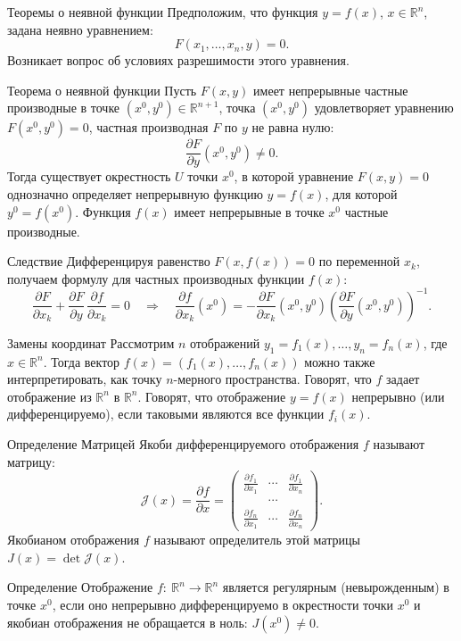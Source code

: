 \documentclass[8pt]{beamer}
\newcommand{\pp}[2]{\frac{\partial #1}{\partial #2}}
\begin{document}
\begin{frame}{Теоремы о неявной функции}
Предположим, что функция $y = f(x)$, $x\in\mathbb{R}^n$, задана неявно уравнением:
$$F(x_1,\ldots, x_n, y) = 0.$$
Возникает вопрос об условиях разрешимости этого уравнения.

\begin{block}{Теорема о неявной функции}
Пусть $F(x,y)$ имеет непрерывные частные производные в точке $(x^0,y^0)\in\mathbb{R}^{n+1}$, точка $(x^0,y^0)$ удовлетворяет уравнению $F(x^0,y^0)=0$, частная производная $F$ по $y$ не равна нулю:
$$\pp{F}{y}(x^0,y^0)\ne 0.$$
Тогда существует окрестность $U$ точки $x^0$, в которой уравнение $F(x,y)=0$ однозначно определяет непрерывную функцию $y = f(x)$, для которой $y^0=f(x^0)$. Функция $f(x)$ имеет непрерывные в точке $x^0$ частные производные.
\end{block}
\begin{block}{Следствие}
Дифференцируя равенство $F(x,f(x))=0$ по переменной $x_k$, получаем формулу для частных производных функции $f(x)$:
$$\pp{F}{x_k}+ \pp{F}{y}\, \pp{f}{x_k}= 0
\quad\Rightarrow\quad
\pp{f}{x_k}(x^0) = - \pp{F}{x_k}(x^0,y^0)\left( \pp{F}{y}(x^0, y^0) \right)^{-1}.$$
\end{block}
\end{frame}

\begin{frame}{Замены координат}
Рассмотрим $n$ отображений $y_1 = f_1(x),\ldots, y_n = f_n(x)$, где $x\in\mathbb{R}^n$. Тогда вектор $f(x) = (f_1(x),\ldots,f_n(x))$ можно также интерпретировать, как точку $n$-мерного пространства. Говорят, что $f$ задает отображение из $\mathbb{R}^n$ в $\mathbb{R}^n$. Говорят, что отображение $y=f(x)$ непрерывно (или дифференцируемо), если таковыми являются все функции $f_i(x)$.
\begin{block}{Определение}
Матрицей Якоби дифференцируемого отображения $f$ называют матрицу:
$$\mathcal{J}(x) = \pp{f}{x} =  \left(\begin{array}{cccc}
\pp{f_1}{x_1}&\cdots&\pp{f_1}{x_n}\\
& \cdots & \\
\pp{f_n}{x_1}&\cdots&\pp{f_n}{x_n}
\end{array}\right).$$
Якобианом отображения $f$ называют определитель этой матрицы  $J(x) = \det \mathcal{J}(x)$.
\end{block}
\begin{block}{Определение}
Отображение $f:\ \mathbb{R}^n\to\mathbb{R}^n$ является регулярным (невырожденным) в точке $x^0$, если оно непрерывно дифференцируемо в окрестности точки $x^0$ и якобиан отображения не обращается в ноль: $J(x^0)\ne0$.
\end{block}
\end{frame}
\end{document}
